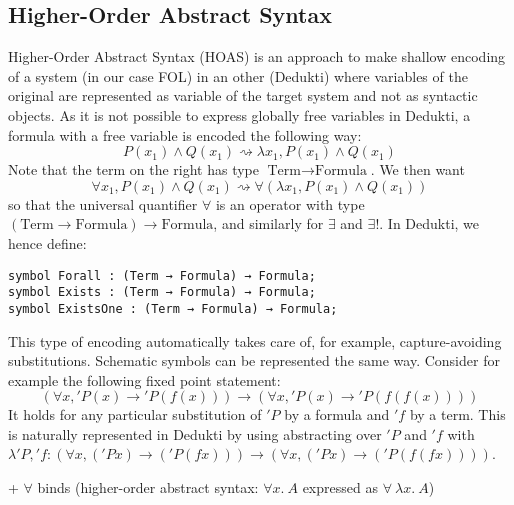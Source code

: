 \documentclass{article}
\newcommand{\Term}{\text{Term}}
\newcommand{\Formula}{\text{Formula}}
\begin{document}
	\subsection{Higher-Order Abstract Syntax}
	Higher-Order Abstract Syntax (HOAS) is an approach to make shallow encoding of a system (in our case FOL) in an other (Dedukti) where variables of the original are represented as variable of the target system and not as syntactic objects. As it is not possible to express globally free variables in Dedukti, a formula with a free variable is encoded the following way:
	$$
	P(x_1) \land Q(x_1) \rightsquigarrow \lambda x_1 ,  P(x_1) \land Q(x_1)
	$$
	Note that the term on the right has type $\Term \rightarrow \Formula$. We then want
	$$
	\forall x_1, P(x_1) \land Q(x_1) \rightsquigarrow \forall (\lambda x_1 ,  P(x_1) \land Q(x_1))
	$$
	so that the universal quantifier $\forall$ is an operator with type $(\Term \rightarrow \Formula) \rightarrow \Formula$, and similarly for $\exists$ and $\exists !$. In Dedukti, we hence define:
	\begin{lstlisting}[language=Dialekto]
symbol Forall : (Term → Formula) → Formula;
symbol Exists : (Term → Formula) → Formula;
symbol ExistsOne : (Term → Formula) → Formula;
\end{lstlisting}
This type of encoding automatically takes care of, for example, capture-avoiding substitutions. Schematic symbols can be represented the same way. Consider for example the following fixed point statement:
$$
	(\forall x, 'P(x) \rightarrow 'P(f(x))) \rightarrow (\forall x, 'P(x) \rightarrow 'P(f(f(x))))
$$
It holds for any particular substitution of $'P$ by a formula and $'f$ by a term. This is naturally represented in Dedukti by using abstracting over $'P$ and $'f$ with $\lambda 'P, 'f: (\forall x, ('P x) \rightarrow ('P(f x))) \rightarrow (\forall x, ('P x) \rightarrow ('P (f (f x))))$.
	
	+ $\forall$ binds (higher-order abstract syntax: $\forall x.~A$ expressed as $\forall~\lambda x.~A$)
	
\end{document}

